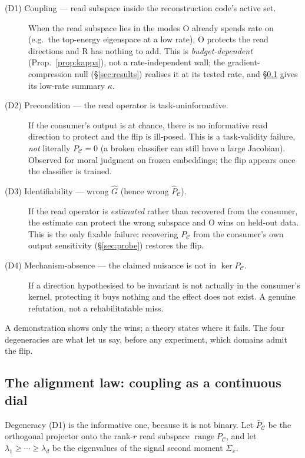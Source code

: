 \documentclass[10pt]{article} %
\theoremstyle{remark}
\newcommand{\PC}{P_{\mathcal{C}}}
\newcommand{\PCbar}{\bar P_{\mathcal{C}}}
\newcommand{\Sx}{\Sigma_{x}}
\newcommand{\kalign}{\kappa}
\begin{document}
\begin{description}
\item[(D1) Coupling --- read subspace inside the reconstruction code's active set.] When
the read subspace lies in the modes O already spends rate on (e.g.\ the top-energy
eigenspace at a low rate), O protects the read directions and R has nothing to add. This is
\emph{budget-dependent} (Prop.~\ref{prop:kappa}), not a rate-independent wall; the
gradient-compression null (\S\ref{sec:results}) realises it at its tested rate, and
\S\ref{sec:kappa} gives its low-rate summary $\kalign$.
\item[(D2) Precondition --- the read operator is task-uninformative.] If the consumer's
output is at chance, there is no informative read direction to protect and the flip is
ill-posed. This is a task-validity failure, \emph{not} literally $\PC=0$ (a broken
classifier can still have a large Jacobian). Observed for moral judgment on frozen
embeddings; the flip appears once the classifier is trained.
\item[(D3) Identifiability --- wrong $\hat G$ (hence wrong $\hat\PC$).] If the read
operator is \emph{estimated} rather than recovered from the consumer, the estimate can
protect the wrong subspace and O wins on held-out data. This is the only fixable failure:
recovering $\PC$ from the consumer's own output sensitivity (\S\ref{sec:probe}) restores
the flip.
\item[(D4) Mechanism-absence --- the claimed nuisance is not in $\ker\PC$.] If a
direction hypothesised to be invariant is not actually in the consumer's kernel,
protecting it buys nothing and the effect does not exist. A genuine refutation, not a
rehabilitatable miss.
\end{description}

\noindent A demonstration shows only the wins; a theory states where it fails. The four
degeneracies are what let us say, before any experiment, which domains admit the flip.

\subsection{The alignment law: coupling as a continuous dial}\label{sec:kappa}

Degeneracy (D1) is the informative one, because it is not binary. Let $\PCbar$ be the
orthogonal projector onto the rank-$r$ read subspace $\operatorname{range}\PC$, and let
$\lambda_1\ge\cdots\ge\lambda_d$ be the eigenvalues of the signal second moment $\Sx$.
\end{document}
